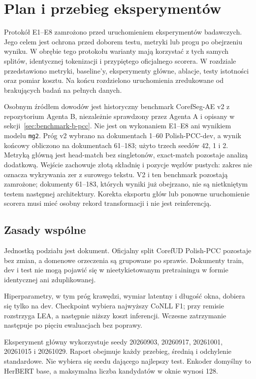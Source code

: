 \chapter{Plan i przebieg eksperymentów}
\label{chap:eksperymenty}

Protokół E1--E8 zamrożono przed uruchomieniem eksperymentów badawczych. Jego celem jest ochrona przed doborem testu, metryki lub progu po obejrzeniu wyniku. W obrębie tego protokołu warianty mają korzystać z tych samych splitów, identycznej tokenizacji i przypiętego oficjalnego scorera. W rozdziale przedstawiono metryki, baseline’y, eksperymenty główne, ablacje, testy istotności oraz pomiar kosztu. Na końcu rozdzielono uruchomienia zredukowane od brakujących badań na pełnych danych.

Osobnym źródłem dowodów jest historyczny benchmark CorefSeg-AE v2 z repozytorium Agenta B, niezależnie sprawdzony przez Agenta A i opisany w sekcji~\ref{sec:benchmark-b-pcc}. Nie jest on wykonaniem E1--E8 ani wynikiem modelu \texttt{mg2}. Próg v2 wybrano na dokumentach 1--60 Polish-PCC-dev, a wynik końcowy obliczono na dokumentach 61--183; użyto trzech seedów 42, 1 i 2. Metryką główną jest head-match bez singletonów, exact-match pozostaje analizą dodatkową. Wejście zachowuje złotą składnię i pozycje węzłów pustych: zakres  nie oznacza wykrywania zer z surowego tekstu. V2 i ten benchmark pozostają zamrożone; dokumenty 61--183, których wyniki już obejrzano, nie są nietkniętym testem następnej architektury. Korekta eksportu głów lub ponowne uruchomienie scorera musi mieć osobny rekord transformacji i nie jest reinferencją.

\section{Zasady wspólne}
\label{sec:zasady-eksperymentow}

Jednostką podziału jest dokument. Oficjalny split CorefUD Polish-PCC pozostaje bez zmian, a domenowe orzeczenia są grupowane po sprawie. Dokumenty train, dev i test nie mogą pojawić się w nieetykietowanym pretrainingu w formie identycznej ani zduplikowanej.

Hiperparametry, w tym próg krawędzi, wymiar latentny i długość okna, dobiera się tylko na dev. Checkpoint wybiera najwyższy CoNLL F1; przy remisie rozstrzyga LEA, a następnie niższy koszt inferencji. Wczesne zatrzymanie następuje po pięciu ewaluacjach bez poprawy.

Eksperyment główny wykorzystuje seedy 20260903, 20260917, 20261001, 20261015 i 20261029. Raport obejmuje każdy przebieg, średnią i odchylenie standardowe. Nie wybiera się seedu dającego najlepszy test. Enkoder domyślny to HerBERT base, a maksymalna liczba kandydatów w oknie wynosi 128.

